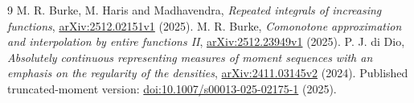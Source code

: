 \documentclass[11pt]{article}
\begin{document}
\begin{thebibliography}{9}
 M. R. Burke, M. Haris and Madhavendra,
\emph{Repeated integrals of increasing functions},
\href{https://arxiv.org/abs/2512.02151v1}{arXiv:2512.02151v1} (2025).
 M. R. Burke,
\emph{Comonotone approximation and interpolation by entire functions II},
\href{https://arxiv.org/abs/2512.23949v1}{arXiv:2512.23949v1} (2025).
 P. J. di Dio,
\emph{Absolutely continuous representing measures of moment sequences
with an emphasis on the regularity of the densities},
\href{https://arxiv.org/abs/2411.03145v2}{arXiv:2411.03145v2} (2024).
Published truncated-moment version:
\href{https://doi.org/10.1007/s00013-025-02175-1}{doi:10.1007/s00013-025-02175-1}
(2025).
\end{thebibliography}
\end{document}
